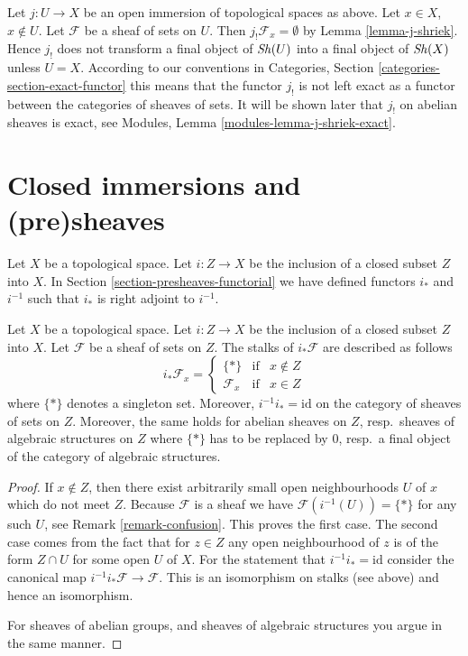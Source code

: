 \begin{remark}
\label{remark-j-shriek-not-exact}
Let $j : U \to X$ be an open immersion of topological spaces as above.
Let $x \in X$, $x \not \in U$. Let $\mathcal{F}$ be a sheaf of sets
on $U$. Then $j_!\mathcal{F}_x = \emptyset$ by Lemma \ref{lemma-j-shriek}.
Hence $j_!$ does not transform a final object of $\mathop{\mathit{Sh}}\nolimits(U)$
into a final object of $\mathop{\mathit{Sh}}\nolimits(X)$ unless $U = X$.
According to our conventions in
Categories, Section \ref{categories-section-exact-functor}
this means that the functor $j_!$ is not left exact
as a functor between the categories of sheaves of sets.
It will be shown later that $j_!$ on abelian sheaves is exact,
see Modules, Lemma \ref{modules-lemma-j-shriek-exact}.
\end{remark}








\section{Closed immersions and (pre)sheaves}
\label{section-closed-immersions}

\noindent
Let $X$ be a topological space.
Let $i : Z \to X$ be the inclusion of a closed subset $Z$ into $X$.
In Section \ref{section-presheaves-functorial} we have defined
functors $i_*$ and $i^{-1}$ such that $i_*$ is right adjoint to
$i^{-1}$.

\begin{lemma}
\label{lemma-stalks-closed-pushforward}
Let $X$ be a topological space.
Let $i : Z \to X$ be the inclusion of a closed subset $Z$ into $X$.
Let $\mathcal{F}$ be a sheaf of sets on $Z$.
The stalks of $i_*\mathcal{F}$ are described as follows
$$
i_*\mathcal{F}_x =
\left\{
\begin{matrix}
\{*\} & \text{if} & x \not \in Z \\
\mathcal{F}_x & \text{if} & x \in Z
\end{matrix}
\right.
$$
where $\{*\}$ denotes a singleton set. Moreover,
$i^{-1}i_* = \text{id}$ on the category of sheaves
of sets on $Z$. Moreover, the same holds for abelian
sheaves on $Z$, resp.\ sheaves of algebraic structures on $Z$
where $\{*\}$ has to be replaced by $0$, resp.\ a
final object of the category of algebraic structures.
\end{lemma}

\begin{proof}
If $x \not \in Z$, then there exist arbitrarily small open
neighbourhoods $U$ of $x$ which do not meet $Z$.
Because $\mathcal{F}$ is a sheaf
we have $\mathcal{F}(i^{-1}(U)) = \{*\}$ for any such $U$,
see Remark \ref{remark-confusion}. This proves the first case.
The second case comes from the fact that for $z \in Z$
any open neighbourhood of $z$ is of the form $Z \cap U$ for
some open $U$ of $X$. For the statement that
$i^{-1}i_* = \text{id}$ consider the canonical map
$i^{-1}i_*\mathcal{F} \to \mathcal{F}$. This is an isomorphism
on stalks (see above) and hence an isomorphism.

\medskip\noindent
For sheaves of abelian groups, and sheaves of algebraic structures
you argue in the same manner.
\end{proof}


